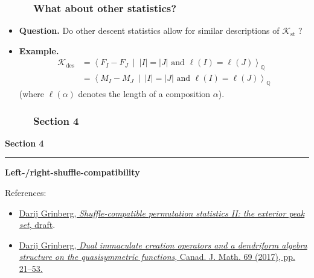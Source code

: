 \documentclass{beamer}
\newcommand{\red}{\color{red}}
\newcommand{\QQ}{{\mathbb Q}}
\newcommand{\des}{\operatorname{des}}
\newcommand{\st}{\operatorname{st}}
\newcommand{\calK}{\mathcal{K}}
\newcommand{\fti}[1]{\frametitle{\ \ \ \ \ #1}}
\newcommand{\abs}[1]{\left| #1 \right|}
\newcommand{\tup}[1]{\left( #1 \right)}
\theoremstyle{plain}
\begin{document}
\begin{frame}
\fti{What about other statistics?}

\begin{itemize}

\item \textbf{Question.}
      Do other descent statistics allow for similar descriptions of
      $\calK_{\st}$ ?

\pause

\item \textbf{Example.}
      \begin{align*}
      \calK_{\des}
      &= \left< F_I - F_J \ \mid \  \abs{I} = \abs{J} \text{ and } \ell\tup{I} = \ell\tup{J} \right>_{\QQ} \\
      &= \left< M_I - M_J \ \mid \  \abs{I} = \abs{J} \text{ and } \ell\tup{I} = \ell\tup{J} \right>_{\QQ}
      \end{align*}
      (where $\ell\tup{\alpha}$ denotes the length of a composition $\alpha$).

\end{itemize}

\end{frame}

\begin{frame}
\fti{Section 4}
\begin{center}
{\LARGE \bf Section 4} \\
\noindent\rule[0.5ex]{\linewidth}{1pt}
{\Large \bf Left-/right-shuffle-compatibility}
\end{center}
\vspace{1cm}
References:
\begin{itemize}
\item \href{https://github.com/darijgr/gzshuf}{\red Darij Grinberg, \textit{Shuffle-compatible permutation statistics II: the exterior peak set}, draft}.
\item \href{http://www.cip.ifi.lmu.de/~grinberg/algebra/dimcreation.pdf}{\red Darij Grinberg, \textit{Dual immaculate creation operators and a dendriform algebra structure on the quasisymmetric functions}, Canad. J. Math. 69 (2017), pp. 21--53.}
\end{itemize}
\end{frame}
\end{document}
